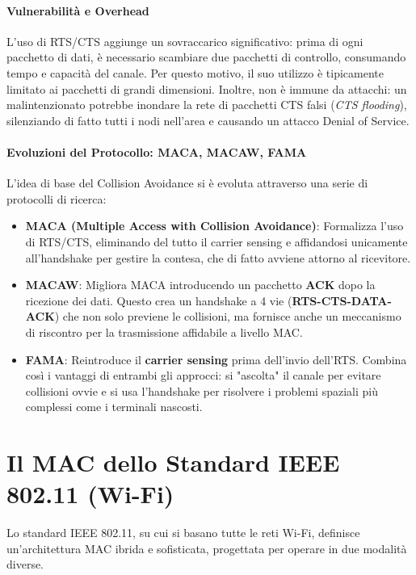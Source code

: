 \paragraph{Vulnerabilità e Overhead}
L'uso di RTS/CTS aggiunge un sovraccarico significativo: prima di ogni pacchetto di dati, è necessario scambiare due pacchetti di controllo, consumando tempo e capacità del canale. Per questo motivo, il suo utilizzo è tipicamente limitato ai pacchetti di grandi dimensioni. Inoltre, non è immune da attacchi: un malintenzionato potrebbe inondare la rete di pacchetti CTS falsi (\textit{CTS flooding}), silenziando di fatto tutti i nodi nell'area e causando un attacco Denial of Service.

\paragraph{Evoluzioni del Protocollo: MACA, MACAW, FAMA}
L'idea di base del Collision Avoidance si è evoluta attraverso una serie di protocolli di ricerca:
\begin{itemize}
    \item \textbf{MACA (Multiple Access with Collision Avoidance)}: Formalizza l'uso di RTS/CTS, eliminando del tutto il carrier sensing e affidandosi unicamente all'handshake per gestire la contesa, che di fatto avviene attorno al ricevitore.
    \item \textbf{MACAW}: Migliora MACA introducendo un pacchetto \textbf{ACK} dopo la ricezione dei dati. Questo crea un handshake a 4 vie (\textbf{RTS-CTS-DATA-ACK}) che non solo previene le collisioni, ma fornisce anche un meccanismo di riscontro per la trasmissione affidabile a livello MAC.
    \item \textbf{FAMA}: Reintroduce il \textbf{carrier sensing} prima dell'invio dell'RTS. Combina così i vantaggi di entrambi gli approcci: si "ascolta" il canale per evitare collisioni ovvie e si usa l'handshake per risolvere i problemi spaziali più complessi come i terminali nascosti.
\end{itemize}

\section{Il MAC dello Standard IEEE 802.11 (Wi-Fi)}
Lo standard IEEE 802.11, su cui si basano tutte le reti Wi-Fi, definisce un'architettura MAC ibrida e sofisticata, progettata per operare in due modalità diverse.

